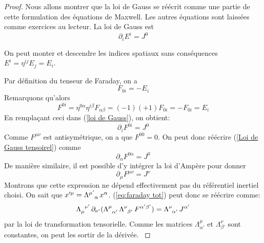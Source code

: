 \begin{proof}
    Nous allons montrer que la loi de Gauss se réécrit comme une partie de cette formulation des équations de Maxwell. Les autres équations sont laissées comme exercices au lecteur. La loi de Gauss est
    \begin{equation}
        \partial_{i}E^{i} = J^{0}
        \label{loi de Gauss}
    \end{equation}
    \begin{rmk}
        On peut monter et descendre les indices spatiaux sans conséquences $E^{i} = \eta^{ij}E_{j} = E_{i}$.
    \end{rmk}
    Par définition du tenseur de Faraday, on a
    \begin{equation*}
        F_{0i} = -E_i
    \end{equation*}
    Remarquons qu'alors
    \begin{equation}
        F^{0i} = \eta ^{0 \alpha} \eta ^{i\beta} F_{\alpha \beta} = (-1)(+1)F_{0i} = -F_{0i} = E_i
        \label{Faraday}
    \end{equation}
    En remplaçant ceci dans (\ref{loi de Gauss}), on obtient:
    \begin{equation}
        \partial_{i}F^{0i} = J^0
        \label{Loi de Gauss tensoirel}
    \end{equation}
    Comme $F^{\mu \nu}$ est antisymétrique, on a que $F^{00} = 0$. On peut donc réécrire (\ref{Loi de Gauss tensoirel}) comme
    \begin{equation*}
        \partial_{\alpha}F^{0\alpha} = J^0
    \end{equation*}
    De manière similaire, il est possible d'y intégrer la loi d'Ampère pour donner
    \begin{equation}
        \label{eq:faraday tot}
        \partial_{\mu}F^{\mu\nu} = J^{\nu}
    \end{equation}
    \cutebreak
    {
    \renewcommand\indexmarker{\cdot}
    Montrons que cette expression ne dépend effectivement pas du référentiel inertiel choisi. On sait que $x'^{\mu} = \Lambda\indices{^{\mu'}_{\alpha}}\,x^{\alpha}$. (\ref{eq:faraday tot}) peut donc se réécrire comme:
    \begin{equation}
        \Lambda\indices{_{\mu}^{\nu '}}\, \partial_{\nu '}(\Lambda\indices{^{\mu}_{\alpha'}}\,\Lambda\indices{^{\nu}_{\beta '}}\,F^{\alpha ' \beta '} ) =  \Lambda\indices{^{\nu }_{\alpha'}}\, J^{\alpha '}
    \end{equation}
    par la loi de transformation tensorielle. Comme les matrices $\Lambda ^{\mu}_{\alpha'}$ et $\Lambda ^{\nu}_{\beta '}$ sont constantes, on peut les sortir de la dérivée. 
}
\end{proof}

